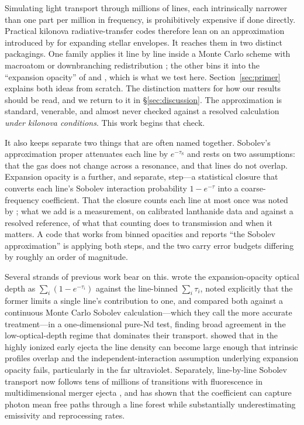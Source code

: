 \documentclass[fleqn,usenatbib]{mnras}
\newcommand{\taus}{\tau_{\mathrm{S}}}
\begin{document}
Simulating light transport through millions of lines, each intrinsically
narrower than one part per million in frequency, is prohibitively expensive
if done directly. Practical kilonova radiative-transfer codes therefore lean
on an approximation introduced by \citet{sobolev1960} for expanding stellar
envelopes. It reaches them in two distinct packagings. One family applies it
line by line inside a Monte Carlo scheme with macroatom or downbranching
redistribution \citep{lucy2002,lucy2003,tardis}; the other bins it into the
``expansion opacity'' of \citet{karp1977} and \citet{eastman1993}, which is
what we test here. Section~\ref{sec:primer} explains both ideas from scratch.
The distinction matters for how our results should be read, and we return to
it in \S\ref{sec:discussion}. The approximation is standard, venerable, and
almost never checked against a resolved calculation \emph{under kilonova
conditions}. This work begins that check.

It also keeps separate two things that are often named together. Sobolev's
approximation proper attenuates each line by $e^{-\taus}$ and rests on two
assumptions: that the gas does not change across a resonance, and that lines
do not overlap. Expansion opacity is a further, and separate, step---a
statistical closure that converts each line's Sobolev interaction probability
$1-e^{-\tau}$ into a coarse-frequency coefficient. That the closure counts each
line at most once was noted by \citet{fontes2020}; what we add is a
measurement, on calibrated lanthanide data and against a resolved reference,
of what that counting does to transmission and when it matters. A code that
works from binned opacities and reports ``the Sobolev approximation'' is
applying both steps, and the two carry error budgets differing by roughly an
order of magnitude.

Several strands of previous work bear on this. \citet{fontes2020} wrote the
expansion-opacity optical depth as $\sum_i(1-e^{-\tau_i})$ against the
line-binned $\sum_i\tau_i$, noted explicitly that the former limits a single
line's contribution to one, and compared both against a continuous Monte
Carlo Sobolev calculation---which they call the more accurate treatment---in
a one-dimensional pure-Nd test, finding broad agreement in the low-optical-depth
regime that dominates their transport. \citet{banerjee2022,banerjee2024} showed
that in the highly ionized early ejecta the line density can become large
enough that intrinsic profiles overlap and the independent-interaction
assumption underlying expansion opacity fails, particularly in the far
ultraviolet. Separately, line-by-line Sobolev transport now follows tens of
millions of transitions with fluorescence in multidimensional merger ejecta
\citep{shingles2023,collins2023,collins2026}, and \citet{morag2026} has
shown that the \citet{eastman1993} coefficient can capture photon mean free
paths through a line forest while substantially underestimating emissivity
and reprocessing rates.
\end{document}
